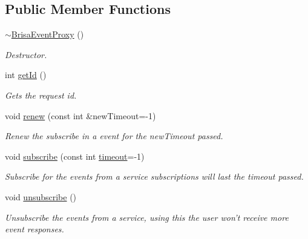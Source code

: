 \subsection*{Public Member Functions}
\begin{DoxyCompactItemize}
\item 
\hyperlink{classBrisaUpnp_1_1BrisaEventProxy_aafe7f03d70c5dc570a2b5865c06996e5}{$\sim$BrisaEventProxy} ()
\begin{DoxyCompactList}\small\item\em Destructor. \item\end{DoxyCompactList}\item 
int \hyperlink{classBrisaUpnp_1_1BrisaEventProxy_ab4e837e9edf3d2e12e5b4d0971deca04}{getId} ()
\begin{DoxyCompactList}\small\item\em Gets the request id. \item\end{DoxyCompactList}\item 
void \hyperlink{classBrisaUpnp_1_1BrisaEventProxy_a9f700f55e37b646bf2cb2c26b98707d8}{renew} (const int \&newTimeout=-\/1)
\begin{DoxyCompactList}\small\item\em Renew the subscribe in a event for the {\itshape newTimeout\/} passed. \item\end{DoxyCompactList}\item 
void \hyperlink{classBrisaUpnp_1_1BrisaEventProxy_ab22e72391031e2e388399065df45b609}{subscribe} (const int \hyperlink{classBrisaUpnp_1_1BrisaAbstractEventSubscription_afb99d42e318e002acc44740a2ca7881a}{timeout}=-\/1)
\begin{DoxyCompactList}\small\item\em Subscribe for the events from a service subscriptions will last the {\itshape timeout\/} passed. \item\end{DoxyCompactList}\item 
void \hyperlink{classBrisaUpnp_1_1BrisaEventProxy_ac106e076f6222480c676470cf51dc055}{unsubscribe} ()
\begin{DoxyCompactList}\small\item\em Unsubscribe the events from a service, using this the user won't receive more event responses. \item\end{DoxyCompactList}\end{DoxyCompactItemize}
